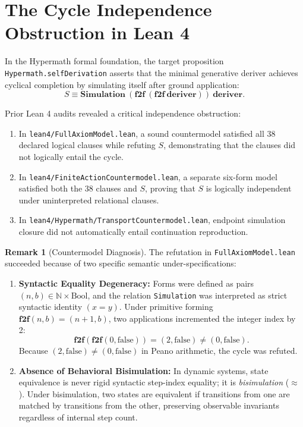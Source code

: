 \documentclass[11pt]{article}
\theoremstyle{definition}
\newtheorem{remark}[theorem]{Remark}
\newcommand{\N}{\mathbb N}
\begin{document}
\section{The Cycle Independence Obstruction in Lean 4}
In the Hypermath formal foundation, the target proposition \texttt{Hypermath.selfDerivation} asserts that the minimal generative deriver achieves cyclical completion by simulating itself after ground application:
\[
S \equiv \mathbf{Simulation}\ (\mathbf{f2f}\ (\mathbf{f2f}\ \mathbf{deriver}))\ \mathbf{deriver}.
\]

Prior Lean 4 audits revealed a critical independence obstruction:
\begin{enumerate}
\item In \texttt{lean4/FullAxiomModel.lean}, a sound countermodel satisfied all 38 declared logical clauses while refuting $S$, demonstrating that the clauses did not logically entail the cycle.
\item In \texttt{lean4/FiniteActionCountermodel.lean}, a separate six-form model satisfied both the 38 clauses and $S$, proving that $S$ is logically independent under uninterpreted relational clauses.
\item In \texttt{lean4/Hypermath/TransportCountermodel.lean}, endpoint simulation closure did not automatically entail continuation reproduction.
\end{enumerate}

\begin{remark}[Countermodel Diagnosis]
The refutation in \texttt{FullAxiomModel.lean} succeeded because of two specific semantic under-specifications:
\begin{enumerate}
\item \textbf{Syntactic Equality Degeneracy:} Forms were defined as pairs $(n, b) \in \N \times \text{Bool}$, and the relation \texttt{Simulation} was interpreted as strict syntactic identity $(x = y)$. Under primitive forming $\mathbf{f2f}(n, b) = (n+1, b)$, two applications incremented the integer index by 2:
\[
\mathbf{f2f}(\mathbf{f2f}(0, \text{false})) = (2, \text{false}) \ne (0, \text{false}).
\]
Because $(2, \text{false}) \ne (0, \text{false})$ in Peano arithmetic, the cycle was refuted.
\item \textbf{Absence of Behavioral Bisimulation:} In dynamic systems, state equivalence is never rigid syntactic step-index equality; it is \emph{bisimulation} ($\approx$). Under bisimulation, two states are equivalent if transitions from one are matched by transitions from the other, preserving observable invariants regardless of internal step count.
\end{enumerate}
\end{remark}
\end{document}
